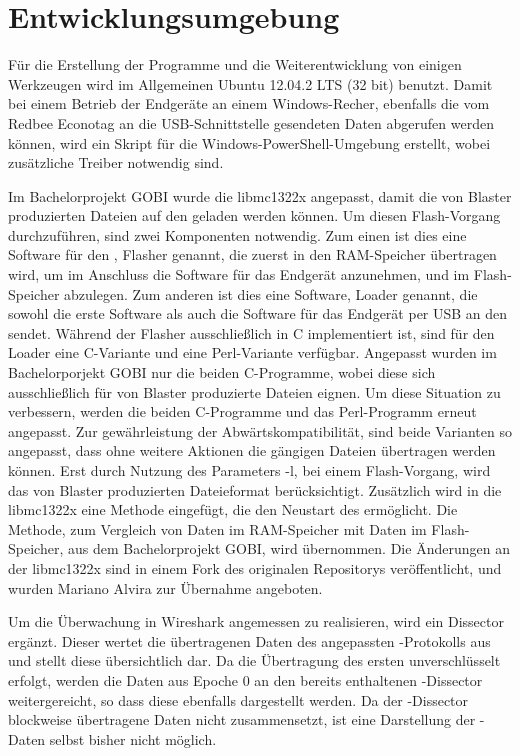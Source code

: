 \section{Entwicklungsumgebung}
\label{sec:entwicklungsumgebung}

Für die Erstellung der Programme und die Weiterentwicklung von einigen Werkzeugen wird im Allgemeinen Ubuntu 12.04.2 LTS (32 bit) benutzt.
Damit bei einem Betrieb der Endgeräte an einem Windows-Recher, ebenfalls die vom Redbee Econotag an die USB-Schnittstelle gesendeten
Daten abgerufen werden können, wird ein Skript für die Windows-PowerShell-Umgebung erstellt, wobei zusätzliche Treiber notwendig sind.

Im Bachelorprojekt GOBI wurde die libmc1322x \cite{libmc1322x} angepasst, damit die von Blaster produzierten Dateien auf den
 geladen werden können. Um diesen Flash-Vorgang durchzuführen, sind zwei Komponenten notwendig. Zum einen ist dies eine
Software für den , Flasher genannt, die zuerst in den RAM-Speicher übertragen wird, um im Anschluss die Software für
das Endgerät anzunehmen, und im Flash-Speicher abzulegen. Zum anderen ist dies eine Software, Loader genannt, die sowohl die erste
Software als auch die Software für das Endgerät per USB an den  sendet. Während der Flasher ausschließlich in C
implementiert ist, sind für den Loader eine C-Variante und eine Perl-Variante verfügbar. Angepasst wurden im Bachelorporjekt GOBI
nur die beiden C-Programme, wobei diese sich ausschließlich für von Blaster produzierte Dateien eignen. Um diese Situation zu verbessern,
werden die beiden C-Programme und das Perl-Programm erneut angepasst. Zur gewährleistung der Abwärtskompatibilität, sind beide Varianten
so angepasst, dass ohne weitere Aktionen die gängigen Dateien übertragen werden können. Erst durch Nutzung des Parameters -l, bei einem
Flash-Vorgang, wird das von Blaster produzierten Dateieformat berücksichtigt. Zusätzlich wird in die libmc1322x eine Methode eingefügt,
die den Neustart des  ermöglicht. Die Methode, zum Vergleich von Daten im RAM-Speicher mit Daten im Flash-Speicher, aus dem
Bachelorprojekt GOBI, wird übernommen. Die Änderungen an der libmc1322x sind in einem Fork des originalen Repositorys veröffentlicht,
und wurden Mariano Alvira zur Übernahme angeboten.

Um die Überwachung in Wireshark \cite{wireshark} angemessen zu realisieren, wird ein Dissector ergänzt. Dieser wertet die übertragenen
Daten des angepassten -Protokolls aus und stellt diese übersichtlich dar. Da die Übertragung des ersten 
unverschlüsselt erfolgt, werden die Daten aus Epoche 0 an den bereits enthaltenen -Dissector weitergereicht, so dass
diese ebenfalls dargestellt werden. Da der -Dissector blockweise übertragene Daten nicht zusammensetzt, ist eine Darstellung
der -Daten selbst bisher nicht möglich.


